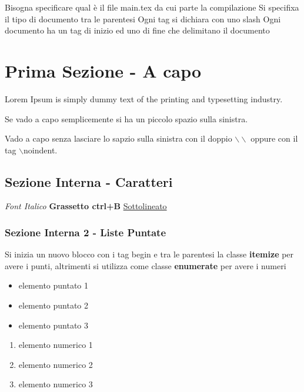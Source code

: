 \documentclass{article}
\begin{document}

Bisogna specificare qual è il file main.tex da cui parte la compilazione
Si specifixa il tipo di documento tra le parentesi
Ogni tag si dichiara con uno slash 
Ogni documento ha un tag di inizio ed uno di fine che delimitano il documento
\section{Prima Sezione - A capo}
\label{sezioneACapo}
Lorem Ipsum is simply dummy text of the printing and typesetting industry.

Se vado a capo semplicemente si ha un piccolo spazio sulla sinistra. 

\noindent Vado a capo senza lasciare lo sapzio sulla sinistra con il doppio $\backslash\backslash$ oppure con il tag $\backslash$noindent. 

\subsection{Sezione Interna - Caratteri}
\textit{Font Italico}
\textbf{Grassetto ctrl+B} 
\underline{Sottolineato}

\subsubsection{Sezione Interna 2 - Liste Puntate}
Si inizia un nuovo blocco con i tag begin e tra le parentesi la classe
\textbf{itemize} per avere i punti, altrimenti si utilizza come classe \textbf{enumerate} per avere i numeri

\begin{itemize}
    \item elemento puntato 1
    \item elemento puntato 2
    \item elemento puntato 3
\end{itemize}
\begin{enumerate}
    \item elemento numerico 1
    \item elemento numerico 2
    \item elemento numerico 3
\end{enumerate}
\end{document}
